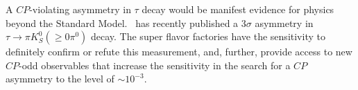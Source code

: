 A $C\!P$-violating asymmetry in $\tau$ decay would be manifest evidence
for physics beyond the Standard Model. \babar\ has recently published
a 3$\sigma$ asymmetry in $\tau\to\pi K_S^0(\ge 0\pi^0)$
decay\cite{BABAR:2011aa}. The super flavor factories have the sensitivity to
definitely confirm or refute this measurement, and, further, provide
access to new $C\!P$-odd observables that increase the sensitivity in the
search for a $C\!P$ asymmetry to the level of $\sim 10^{-3}$.
